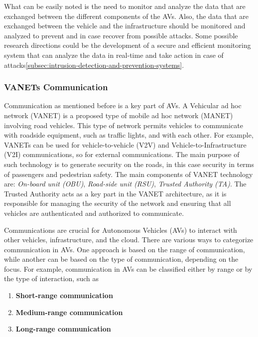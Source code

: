 What can be easily noted is the need to monitor and analyze the data that are exchanged between the different components of the AVs.
Also, the data that are exchanged between the vehicle and the infrastructure should be monitored and analyzed to prevent and in case recover from possible attacks.
Some possible research directions could be the development of a secure and efficient monitoring system that can analyze the data in real-time and take action in case of attacks\ref{subsec:intrusion-detection-and-prevention-systems}.

\subsubsection{VANETs Communication}\label{subsubsec:vanets-communication}

Communication as mentioned before is a key part of AVs.
A Vehicular ad hoc network (VANET) is a proposed type of mobile ad hoc network (MANET) involving road vehicles.
This type of network permits vehicles to communicate with roadside equipment, such as traffic lights, and with each other\cite{sheikh2019comprehensive}.
For example, VANETs can be used for vehicle-to-vehicle (V2V) and Vehicle-to-Infrastructure (V2I) communications, so for external communications.
The main purpose of such technology is to generate security on the roads, in this case security in terms of passengers and pedestrian safety.
The main components of VANET technology are: \textit{On-board unit (OBU)}, \textit{Road-side unit (RSU)}, \textit{Trusted Authority (TA)}.
The Trusted Authority acts as a key part in the VANET architecture,
as it is responsible for managing the security of the network and ensuring that all vehicles are authenticated
and authorized to communicate.

Communications are crucial for Autonomous Vehicles (AVs) to interact with other vehicles, infrastructure, and the cloud.
There are various ways to categorize communication in AVs. One approach is based on the range of communication, while another can be based on the type of communication, depending on the focus.
For example, communication in AVs can be classified either by range or by the type of interaction, such as
\begin{enumerate}
    \item \textbf{Short-range communication}
    \item \textbf{Medium-range communication}
    \item \textbf{Long-range communication}
\end{enumerate}

